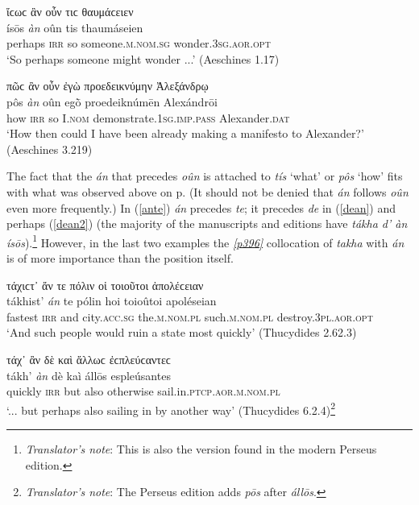 \begin{exe}
\ex ἴϲωϲ ἂν οὖν τιϲ θαυμάϲειεν\\
\gll ísōs \emph{àn} oûn tis thaumáseien\\
perhaps \textsc{irr} so someone.\textsc{m.nom.sg} wonder.\textsc{3sg.aor.opt}\\
\trans `So perhaps someone might wonder ...' (Aeschines 1.17)
\label{displace12}
\end{exe}

\begin{exe}
\ex πῶϲ ἂν οὖν ἐγὼ προεδεικνύμην Ἀλεξάνδρῳ\\
\gll pôs \emph{àn} oûn egṑ proedeiknúmēn Alexándrōi\\
how \textsc{irr} so I.\textsc{nom} demonstrate.\textsc{1sg.imp.pass} Alexander.\textsc{dat}\\
\trans `How then could I have been already making a manifesto to Alexander?' (Aeschines 3.219)
\label{displace13}
\end{exe}

The fact that the \emph{án} that precedes \emph{oûn} is attached to \emph{tís} `what' or \emph{pôs} `how' fits with what was observed above on p\pageref{tisposinitial}. (It should not be denied that \emph{án} follows \emph{oûn} even more frequently.) In (\ref{ante}) \emph{án} precedes \emph{te}; it precedes \emph{de} in (\ref{dean}) and perhaps (\ref{dean2}) (the majority of the manuscripts and editions have \textit{tákha d' \emph{àn} ísōs}).\footnote{\emph{Translator's note}: This is also the version found in the modern Perseus edition.} However, in the last two examples the \hyperlink{p396}{\emph{[p396]}} collocation of \emph{takha} with \emph{án} is of more importance than the position itself.

\begin{exe}
\ex τάχιϲτ᾽ ἄν τε πόλιν οἱ τοιοῦτοι ἀπολέϲειαν\\
\gll tákhist' \emph{án} te pólin hoi toioûtoi apoléseian\\
fastest \textsc{irr} and city.\textsc{acc.sg} the.\textsc{m.nom.pl} such.\textsc{m.nom.pl} destroy.\textsc{3pl.aor.opt}\\
\trans `And such people would ruin a state most quickly' (Thucydides 2.62.3)
\label{ante}
\end{exe}

\begin{exe}
\ex τάχ᾽ ἂν δὲ καὶ ἄλλωϲ ἐϲπλεύϲαντεϲ\\
\gll tákh' \emph{àn} dè kaì állōs espleúsantes\\
quickly \textsc{irr} but also otherwise sail.in.\textsc{ptcp.aor.m.nom.pl}\\
\trans `... but perhaps also sailing in by another way' (Thucydides 6.2.4)\footnote{\emph{Translator's note}: The Perseus edition adds \textit{pōs} after \textit{állōs}.}
\label{dean}
\end{exe}

